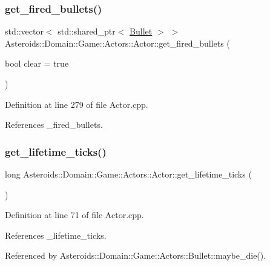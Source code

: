 \subsubsection{\texorpdfstring{get\+\_\+fired\+\_\+bullets()}{get\_fired\_bullets()}}
{\footnotesize\ttfamily std\+::vector$<$ std\+::shared\+\_\+ptr$<$ \hyperlink{classAsteroids_1_1Domain_1_1Game_1_1Actors_1_1Bullet}{Bullet} $>$ $>$ Asteroids\+::\+Domain\+::\+Game\+::\+Actors\+::\+Actor\+::get\+\_\+fired\+\_\+bullets (\begin{DoxyParamCaption}\item[{bool}]{clear = {\ttfamily true} }\end{DoxyParamCaption})}



Definition at line 279 of file Actor.\+cpp.



References \+\_\+fired\+\_\+bullets.

\mbox{\label{classAsteroids_1_1Domain_1_1Game_1_1Actors_1_1Actor_a4e096daf30dca67bcd500fcae7e80979}} 
\subsubsection{\texorpdfstring{get\+\_\+lifetime\+\_\+ticks()}{get\_lifetime\_ticks()}}
{\footnotesize\ttfamily long Asteroids\+::\+Domain\+::\+Game\+::\+Actors\+::\+Actor\+::get\+\_\+lifetime\+\_\+ticks (\begin{DoxyParamCaption}{ }\end{DoxyParamCaption})}



Definition at line 71 of file Actor.\+cpp.



References \+\_\+lifetime\+\_\+ticks.



Referenced by Asteroids\+::\+Domain\+::\+Game\+::\+Actors\+::\+Bullet\+::maybe\+\_\+die().

